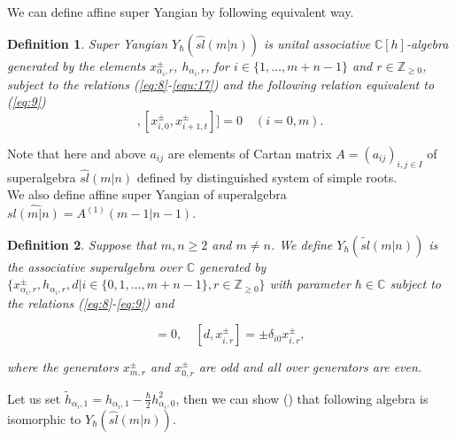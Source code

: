 \documentclass[english]{elsarticle}
\newtheorem{definition}{Definition}[section]
\numberwithin{equation}{section}
\begin{document}
We can define affine super Yangian by following equivalent way.
\begin{definition}
Super Yangian $Y_\hbar(\hat{sl}(m|n))$ is unital associative $\mathbb{C}[h]$-algebra generated by the elements $x_{\alpha_{i},r}^{\pm}$, $h_{\alpha_{i},r}$, for $i \in \{1,\ldots,m+n-1 \}$ and $r \in \mathbb{Z}_{\geq 0}$, subject to the relations (\ref{eq:8}-\ref{equ:17}) and the following relation equivalent to (\ref{eq:9})
\begin{equation}
     [[x_{{i-1},k}^{\pm},x_{{i},0}^{\pm}],[x_{{i},0}^{\pm},x_{{i+1},t}^{\pm}]]=0 \quad (i=0,m).
\end{equation}
\end{definition}
Note that here and above $a_{ij}$  are elements of Cartan matrix $A={(a_{ij})}_{i,j \in I}$ of superalgebra $\hat{sl}(m|n)$ defined by distinguished system of simple roots.\\
We also define affine super Yangian of superalgebra $\hat{sl(m|n)}=A^{(1)}(m-1|n-1)$.
\begin{definition}
Suppose that $m,n\geq 2$ and $m\neq n$. We define $Y_{\hbar}(\tilde{sl}(m|n))$ is the associative superalgebra over $\mathbb{C}$ generated by $\{x_{\alpha_i,r}^{\pm}, h_{\alpha_i,r}, d|i\in \{0,1,\ldots,m+n-1\},r\in \mathbb{Z}_{\geq 0}\}$ with parameter $\hbar \in \mathbb{C}$ subject to the relations (\ref{eq:8}-\ref{eq:9}) and

\begin{equation}
    [d, h_{i,r}]=0,\quad  [d, x_{i,r}^{\pm}]= \pm \delta_{i0}x_{i,r}^{\pm},
\end{equation}

where the generators $x_{m,r}^{\pm}$ and $x_{0,r}^{\pm}$ are odd and all over generators are even.\\
\end{definition}
Let us set $\tilde{h}_{\alpha_i,1} = h_{\alpha_i,1}-\frac{\hbar}{2}h_{\alpha_i,0}^2$, then
we can show (\cite{Ueda}) that following algebra is isomorphic to $Y_{\hbar}(\hat{sl}(m|n))$.
\end{document}
